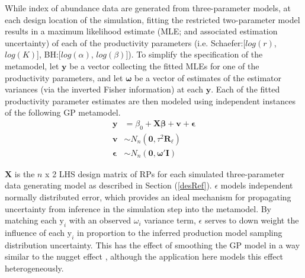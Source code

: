 %
While index of abundance data are generated from three-parameter models, at each
design location of the simulation, fitting the restricted two-parameter model
results in a maximum likelihood estimate (MLE; and associated estimation
uncertainty) of each of the productivity parameters
{\color{red}
(i.e. Schaefer:[$log(r)$, $log(K)$], BH:[$log(\alpha)$, $log(\beta)$]).
}
To simplify the specification of the metamodel, let $\textbf{y}$ be a vector
collecting the fitted MLEs for one of the productivity parameters, and let
$\bm{\omega}$ be a vector of estimates of the estimator variances (via the
inverted Fisher information) at each $\textbf{y}$.
%
Each of the fitted productivity parameter estimates are then modeled using
independent instances of the following GP metamodel. %
\begin{align} \label{GPModel}
        \textbf{y} &= \beta_0 + \bm{X}\bm{\beta} + \bm{v} + \bm{\epsilon} \nonumber \\
        \bm{v} &\sim N_n(\bm{0}, \tau^2 \bm{R_{\ell}}) \\
        \bm{\epsilon} &\sim N_n(\bm{0}, \bm{\omega}'\bm{I}) \nonumber
\end{align}
%


$\bm{X}$ is the $n$ x 2 LHS design matrix of RPs for each simulated %
three-parameter data generating model as described in Section (\ref{desRef}).
$\epsilon$ models independent normally distributed error, which provides an
ideal mechanism for propagating uncertainty from inference in the simulation
step into the metamodel. By matching each $\text{y}_i$ with an observed $\omega_i$
variance term, $\epsilon$ serves to down weight the influence of each $\text{y}_i$
in proportion to the inferred production model sampling distribution
uncertainty. This has the effect of smoothing the GP model in a way similar to
the nugget effect \cite{gramacy_cases_2012}, although the application
here models this effect heterogeneously.

